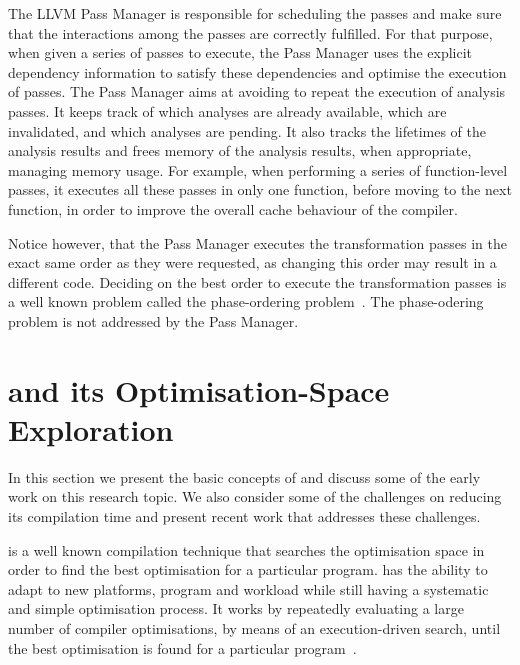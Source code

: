 The LLVM Pass Manager is responsible for scheduling the passes and make sure that the interactions among the passes are correctly fulfilled.
For that purpose, when given a series of passes to execute, the Pass Manager uses the explicit dependency information to satisfy these dependencies and optimise the execution of passes.
The Pass Manager aims at avoiding to repeat the execution of analysis passes.
It keeps track of which analyses are already available, which are invalidated, and which analyses are pending.
It also tracks the lifetimes of the analysis results and frees memory of the analysis results, when appropriate, managing memory usage.
For example, when performing a series of function-level passes, it executes all these passes in only one function, before moving to the next function, in order to improve the overall cache behaviour of the compiler.

Notice however, that the Pass Manager executes the transformation passes in the exact same order as they were requested, as changing this order may result in a different code.
Deciding on the best order to execute the transformation passes is a well known problem called the phase-ordering problem~\citep{touati06,kulkarni12,jantz14}.
The phase-odering problem is not addressed by the Pass Manager.

\section{{\IterComp} and its Optimisation-Space Exploration}


In this section we present the basic concepts of {\itercomp} and discuss some of the early work on this research topic.
We also consider some of the challenges on reducing its compilation time and present recent work that addresses these challenges.

{\Itercomp} is a well known compilation technique that searches the optimisation space in order to find the best optimisation for a particular program.
{\Itercomp} has the ability to adapt to new platforms, program and workload while still having a systematic and simple optimisation process.
It works by repeatedly evaluating a large number of compiler optimisations, by means of an execution-driven search, until the best optimisation is found for a particular program~\citep{kisuki99,fursin07,chen10}.

